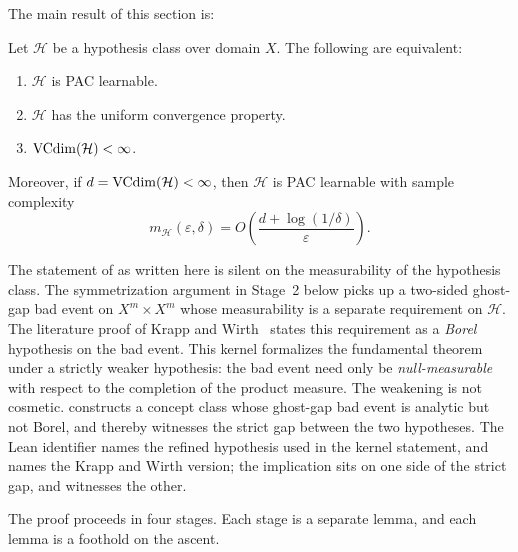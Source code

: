 The main result of this section is:

\begin{thm}
\label{thm:vc-char}
  \leanok
Let $\mathcal{H}$ be a hypothesis class over domain $X$.  The following are
equivalent:
\begin{enumerate}[label=(\roman*)]
\item $\mathcal{H}$ is PAC learnable.
\item $\mathcal{H}$ has the uniform convergence property.
\item $\mathrm{VCdim}(\mathcal{H}) < \infty$.
\end{enumerate}
Moreover, if $d = \mathrm{VCdim}(\mathcal{H}) < \infty$, then $\mathcal{H}$ is PAC
learnable with sample complexity
\[
  m_\mathcal{H}(\varepsilon, \delta)
  = O\!\left(\frac{d + \log(1/\delta)}{\varepsilon}\right).
\]
\end{thm}

\begin{remark}
\label{rmk:wbvc-refinement}
The statement of  as written here is silent on the
measurability of the hypothesis class. The symmetrization argument in
Stage~2 below picks up a two-sided ghost-gap bad event on
$X^m \times X^m$ whose measurability is a separate requirement on
$\mathcal{H}$. The literature proof of
Krapp and Wirth~\cite{KrappWirth2024} states this requirement as a
\emph{Borel} hypothesis on the bad event. This kernel formalizes the
fundamental theorem under a strictly weaker hypothesis: the bad event
need only be \emph{null-measurable} with respect to the completion of
the product measure. The weakening is not cosmetic.
 constructs a concept class whose ghost-gap
bad event is analytic but not Borel, and thereby witnesses the strict
gap between the two hypotheses. The Lean identifier
 names the refined hypothesis used in
the kernel statement, and  names the Krapp
and Wirth version; the implication
 sits on one side of the
strict gap, and  witnesses the
other.
\end{remark}

The proof proceeds in four stages.  Each stage is a separate lemma,
and each lemma is a foothold on the ascent.

